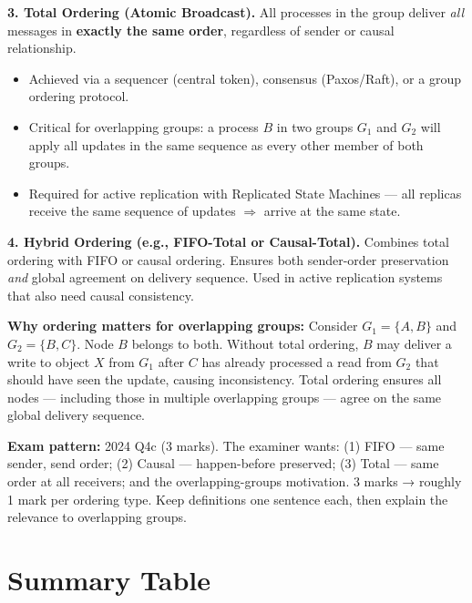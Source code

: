 \documentclass[12pt,a4paper]{article}
\begin{document}
\begin{solbox}
\textbf{3. Total Ordering (Atomic Broadcast).}
All processes in the group deliver \emph{all} messages in \textbf{exactly the same order},
regardless of sender or causal relationship.
\begin{itemize}
  \item Achieved via a sequencer (central token), consensus (Paxos/Raft), or
        a group ordering protocol.
  \item Critical for overlapping groups: a process $B$ in two groups $G_1$ and $G_2$
        will apply all updates in the same sequence as every other member of both groups.
  \item Required for active replication with Replicated State Machines — all replicas
        receive the same sequence of updates $\Rightarrow$ arrive at the same state.
\end{itemize}

\textbf{4. Hybrid Ordering (e.g., FIFO-Total or Causal-Total).}
Combines total ordering with FIFO or causal ordering.
Ensures both sender-order preservation \emph{and} global agreement on delivery sequence.
Used in active replication systems that also need causal consistency.

\medskip
\textbf{Why ordering matters for overlapping groups:}
Consider $G_1 = \{A, B\}$ and $G_2 = \{B, C\}$. Node $B$ belongs to both.
Without total ordering, $B$ may deliver a write to object $X$ from $G_1$ after $C$ has
already processed a read from $G_2$ that should have seen the update, causing
inconsistency. Total ordering ensures all nodes — including those in multiple overlapping
groups — agree on the same global delivery sequence.
\end{solbox}

\begin{notesbox}
\textbf{Exam pattern:} 2024 Q4c (3 marks).
The examiner wants: (1) FIFO — same sender, send order; (2) Causal — happen-before
preserved; (3) Total — same order at all receivers; and the overlapping-groups motivation.
3 marks → roughly 1 mark per ordering type. Keep definitions one sentence each, then
explain the relevance to overlapping groups.
\end{notesbox}

\newpage
\section{Summary Table}
\end{document}

